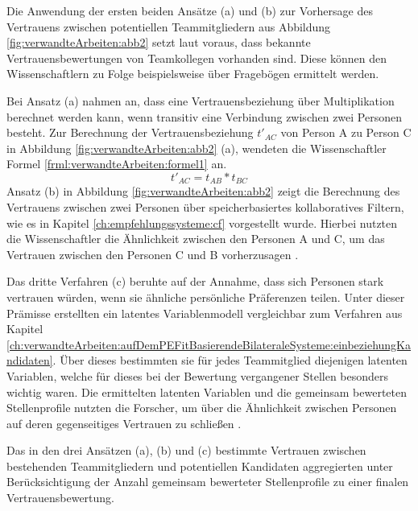 Die Anwendung der ersten beiden Ansätze (a) und (b) zur Vorhersage des Vertrauens zwischen potentiellen Teammitgliedern aus Abbildung \ref{fig:verwandteArbeiten:abb2} setzt laut \textcite[S. 4ff.]{malinowski:2005} voraus, dass bekannte Vertrauensbewertungen von Teamkollegen vorhanden sind. Diese können den Wissenschaftlern zu Folge beispielsweise über Fragebögen ermittelt werden.

Bei Ansatz (a) nahmen \textcite[S. 5f.]{malinowski:2005} an, dass eine Vertrauensbeziehung über Multiplikation berechnet werden kann, wenn transitiv eine Verbindung zwischen zwei Personen besteht. Zur Berechnung der Vertrauensbeziehung $t'_{AC}$ von Person A zu Person C in Abbildung \ref{fig:verwandteArbeiten:abb2} (a), wendeten die Wissenschaftler Formel \ref{frml:verwandteArbeiten:formel1} an.
\begin{equation}
	t'_{AC} = t_{AB} * t_{BC}
	\label{frml:verwandteArbeiten:formel1}
\end{equation}
Ansatz (b) in Abbildung \ref{fig:verwandteArbeiten:abb2} zeigt die Berechnung des Vertrauens zwischen zwei Personen über speicherbasiertes kollaboratives Filtern, wie es in Kapitel \ref{ch:empfehlungssysteme:cf} vorgestellt wurde. Hierbei nutzten die Wissenschaftler die Ähnlichkeit zwischen den Personen A und C, um das Vertrauen zwischen den Personen C und B vorherzusagen \cite[S. 6]{malinowski:2005}.

Das dritte Verfahren (c) beruhte auf der Annahme, dass sich Personen stark vertrauen würden, wenn sie ähnliche persönliche Präferenzen teilen. Unter dieser Prämisse erstellten \textcite[S. 6f.]{malinowski:2005} ein latentes Variablenmodell vergleichbar zum Verfahren aus Kapitel \ref{ch:verwandteArbeiten:aufDemPEFitBasierendeBilateraleSysteme:einbeziehungKandidaten}. Über dieses bestimmten sie für jedes Teammitglied diejenigen latenten Variablen, welche für dieses bei der Bewertung vergangener Stellen besonders wichtig waren. Die ermittelten latenten Variablen und die gemeinsam bewerteten Stellenprofile nutzten die Forscher, um über die Ähnlichkeit zwischen Personen auf deren gegenseitiges Vertrauen zu schließen \cite[S. 6f.]{malinowski:2005}.

Das in den drei Ansätzen (a), (b) und (c) bestimmte Vertrauen zwischen bestehenden Teammitgliedern und potentiellen Kandidaten aggregierten \textcite[S. 7ff.]{malinowski:2005} unter Berücksichtigung der Anzahl gemeinsam bewerteter Stellenprofile zu einer finalen Vertrauensbewertung.

